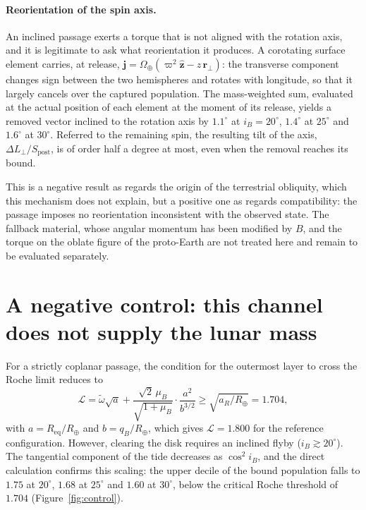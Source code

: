 \documentclass[11pt,a4paper]{article}
\begin{document}
\paragraph{Reorientation of the spin axis.}
An inclined passage exerts a torque that is not aligned with the rotation axis, and it is legitimate to ask what reorientation it produces. A corotating surface element carries, at release, $\mathbf{j}=\Omega_\oplus(\varpi^{2}\hat{\mathbf z}-z\,\mathbf r_\perp)$: the transverse component changes sign between the two hemispheres and rotates with longitude, so that it largely cancels over the captured population. The mass-weighted sum, evaluated at the actual position of each element at the moment of its release, yields a removed vector inclined to the rotation axis by $1.1^\circ$ at $i_B=20^\circ$, $1.4^\circ$ at $25^\circ$ and $1.6^\circ$ at $30^\circ$. Referred to the remaining spin, the resulting tilt of the axis, $\Delta L_\perp/S_{\mathrm{post}}$, is of order half a degree at most, even when the removal reaches its bound.

This is a negative result as regards the origin of the terrestrial obliquity, which this mechanism does not explain, but a positive one as regards compatibility: the passage imposes no reorientation inconsistent with the observed state. The fallback material, whose angular momentum has been modified by $B$, and the torque on the oblate figure of the proto-Earth are not treated here and remain to be evaluated separately.

\section{A negative control: this channel does not supply the lunar mass}

For a strictly coplanar passage, the condition for the outermost layer to cross the Roche limit reduces to
\begin{equation}
\mathcal{L} = \tilde{\omega}\sqrt{a} + \frac{\sqrt{2}\,\mu_B}{\sqrt{1+\mu_B}} \cdot \frac{a^2}{b^{3/2}} \ge \sqrt{a_R/R_\oplus} = 1.704,
\end{equation}
with $a=R_{\mathrm{eq}}/R_\oplus$ and $b=q_B/R_\oplus$, which gives $\mathcal{L}=1.800$ for the reference configuration. However, clearing the disk requires an inclined flyby ($i_B\gtrsim20^\circ$). The tangential component of the tide decreases as $\cos^2 i_B$, and the direct calculation confirms this scaling: the upper decile of the bound population falls to $1.75$ at $20^\circ$, $1.68$ at $25^\circ$ and $1.60$ at $30^\circ$, below the critical Roche threshold of $1.704$ (Figure~\ref{fig:control}).
\end{document}
